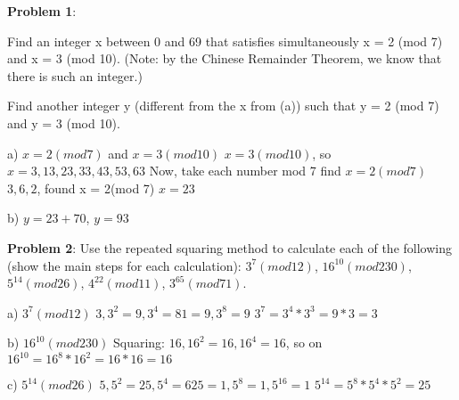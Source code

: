 \documentclass[12pt,letterpaper,final]{report}
\begin{document}

\vline


\noindent\textbf{Problem 1}: 
 
\begin{alphalist}
	\item Find an integer x between 0 and 69 that satisfies simultaneously x = 2 (mod 7) and x = 3 (mod 10). 		(Note: by the Chinese Remainder Theorem, we know that there is such an integer.)
	\item Find another integer y (different from the x from (a)) such that  y = 2  (mod 7) and  y = 3 (mod 10).
\end{alphalist}

\bigskip
 a) $x = 2(mod7)$ and $x = 3(mod 10)$
\newline $x = 3(mod 10)$, so $x = 3, 13, 23, 33, 43, 53, 63$
\newline Now, take each number mod 7 find $x = 2(mod 7)$
\newline $3, 6, 2$, found x = 2(mod 7)
\newline $x = 23$

 b) $y = 23 + 70$, $y = 93$

\bigskip
\noindent\textbf{Problem 2}:  Use the repeated squaring method to calculate each of the following (show the main steps for each calculation): $3^{7} (mod 12)$,  $16^{10} (mod 230)$,  $5^{14} (mod 26)$,  $4^{22} (mod 11)$,  $3^{65} (mod 71)$.

 a)  $3^{7} (mod 12)$
\newline $3, 3^{2} = 9, 3^{4} = 81=9,3^{8} =  9$
\newline $3^{7} = 3^{4} * 3^{3} = 9 * 3 = 3$

 b)  $16^{10} (mod 230)$
\newline Squaring: $16, 16^{2} = 16, 16^{4} = 16$, so on
\newline $16^{10} = 16^{8} * 16^{2} = 16*16 = 16$

 c)  $5^{14} (mod 26)$
\newline $5, 5^{2} = 25, 5^{4} = 625=1, 5^{8} = 1, 5^{16} = 1$
\newline $5^{14} = 5^{8} * 5^{4} * 5^{2} = 25$
\end{document}
